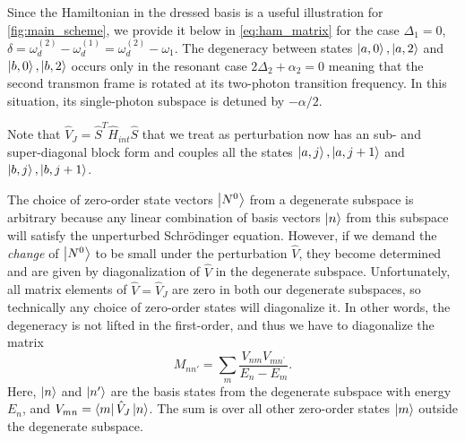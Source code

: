 \documentclass[%
 aps, prx,
 amsmath,amssymb,
 reprint,%
superscriptaddress
]{revtex4-2}
\begin{document}
Since the Hamiltonian in the dressed basis is a 
useful illustration for 
\autoref{fig:main_scheme}, we provide it below in 
\autoref{eq:ham_matrix} for the case $\Delta_1 = 
0$, $\delta = \omega_d^{(2)} - 	\omega_d^{(1)} = 
\omega_d^{(2)} - \omega_1$. The degeneracy between 
states $\ket{a, 0}, \ket{a,2}$ and $\ket{b, 0}, 
\ket{b,2}$ occurs only in the resonant case 
$2\Delta_2   + \alpha_2 = 0$ meaning that the 
second transmon frame is rotated at its 
two-photon transition frequency. In this 
situation, its single-photon subspace is detuned 
by $-\alpha/2$.



Note that $\hat V_J = \hat S^T \hat H_{int} \hat 
S$ that we treat as perturbation now has an sub- 
and super-diagonal block form and couples all the 
states $\ket{a, j}, \ket{a,j+1}$ and $\ket{b, j}, 
\ket{b,j+1}$.



The choice of zero-order state vectors $\ket{N^0}$ from a degenerate subspace is arbitrary because any linear combination of basis vectors $\ket{n}$ from this subspace will satisfy the unperturbed Schrödinger equation. However, if we demand the \textit{change} of $\ket{N^0}$ to be small under the perturbation $\hat V$, they become determined and are given by diagonalization of $\hat V$ in the degenerate subspace. Unfortunately, all matrix elements of $\hat V = \hat V_J$ are zero in both our degenerate subspaces, so technically any choice of zero-order states will diagonalize it. In other words, the degeneracy is not lifted in the first-order, and thus we have to diagonalize the matrix \cite{landau2013quantum}
\begin{equation}
	M_{nn'} = \sum\limits_{m}\frac{V_{ nm}V_{mn^\prime}}{E_n-E_m}.
\end{equation}
Here, $\ket{n}$ and $\ket{n'}$ are the basis 
states from the degenerate subspace with energy 
$E_n$, and $V_{mn} = \bra{m} \hat  V_J \ket{n}$. 
The sum is over all other zero-order states 
$\ket{m}$ outside the degenerate subspace.
\end{document}
